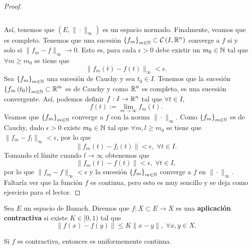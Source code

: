 \begin{proof}
\begin{itemize}
\[		\]
	\end{itemize}
	Así, tenemos que $\displaystyle \left(E, \| \cdot \|_{\infty}\right) $ es un espacio normado. Finalmente, veamos que es completo. Tenemos que una sucesión $\displaystyle \left\{ f_{m}\right\} _{m\in\mathbb{N}}\subset \mathcal{C}\left(I, \mathbb{R}^{n}\right) $ converge a $\displaystyle f $ si y solo si $\displaystyle \|f_{m}-f\|_{\infty} \to 0 $. Esto es, para cada $\displaystyle \epsilon > 0 $ debe existir un $\displaystyle m_{0} \in \mathbb{N} $ tal que $\displaystyle \forall m \geq m_{0} $ se tiene que 
	\[\|f_{m}\left(t\right)-f\left(t\right)\|_{\infty} < \epsilon .\]
	Sea $\displaystyle \left\{ f_{m}\right\} _{m\in\mathbb{N}} $ una sucesión de Cauchy y sea $\displaystyle t_{0} \in I $. Tenemos que la sucesión $\displaystyle \left\{ f_{m}\left(t_{0}\right)\right\} _{m\in\mathbb{N}}\subset \mathbb{R}^{m} $ es de Cauchy y como $\displaystyle \mathbb{R}^{n} $ es completo, es una sucesión convergente. Así, podemos definir $\displaystyle f : I \to \mathbb{R}^{n} $ tal que $\displaystyle \forall t \in I $, 
	\[f\left(t\right):=\lim_{m \to \infty}f_{m}\left(t\right) .\]
	Veamos que $\displaystyle \left\{ f_{m}\right\} _{m\in\mathbb{N}} $ converge a $\displaystyle f $ con la norma $\displaystyle \| \cdot \|_{\infty} $. Como $\displaystyle \left\{ f_{m}\right\} _{m\in\mathbb{N}} $ es de Cauchy, dado $\displaystyle \epsilon > 0 $ existe $\displaystyle m_{0} \in \mathbb{N} $ tal que $\displaystyle \forall m,l \geq m_{0} $ se tiene que $\displaystyle \|f_{m}-f_{l}\|_{\infty} < \epsilon  $, por lo que 
	\[ \|f_{m}\left(t\right)-f_{l}\left(t\right)\| < \epsilon, \; \forall t \in I .\]
	Tomando el límite cuando $\displaystyle l \to \infty $ obtenemos que
	\[ \|f_{m}\left(t\right)-f\left(t\right)\|<\epsilon, \; \forall t \in I ,\]
	por lo que $\displaystyle \|f_{m}-f\|_{\infty}<\epsilon  $ y la sucesión $\displaystyle \left\{ f_{m}\right\} _{m\in\mathbb{N}} $ converge a $\displaystyle f $ en $\displaystyle \| \cdot \|_{\infty} $. Faltaría ver que la función $\displaystyle f $ es continua, pero esto es muy sencillo y se deja como ejercicio para el lector.
\end{proof}
\begin{definition}
Sea $\displaystyle E $ un espacio de Banach. Diremos que $\displaystyle f: X \subset E \to X $ es una \textbf{aplicación contractiva} si existe $\displaystyle K \in [0,1) $ tal que 
\[ \|f\left(x\right)-f\left(y\right)\|\leq K \|x-y\|, \; \forall x,y \in X .\]
\end{definition}
\begin{observation}
Si $\displaystyle f $ es contractiva, entonces es uniformemente continua.
\end{observation}
